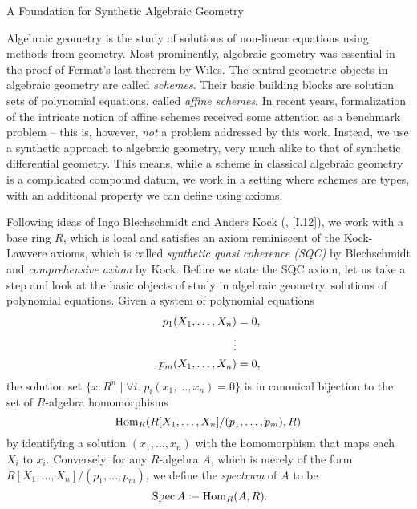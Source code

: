 \documentclass{../util/zariski}
\begin{document}
\begin{center}
  \LARGE{A Foundation for Synthetic Algebraic Geometry}
\end{center}

Algebraic geometry is the study of solutions of non-linear equations using methods from geometry.
Most prominently, algebraic geometry was essential in the proof of Fermat's last theorem by Wiles.
The central geometric objects in algebraic geometry are called \emph{schemes}.
Their basic building blocks are solution sets of polynomial equations, called \emph{affine schemes}.
In recent years,
formalization of the intricate notion of affine schemes
received some attention as a benchmark problem
-- this is, however, \emph{not} a problem addressed by this work.
Instead, we use a synthetic approach to algebraic geometry,
very much alike to that of synthetic differential geometry.
This means, while a scheme in classical algebraic geometry is a complicated compound datum,
we work in a setting where schemes are types,
with an additional property we can define using axioms.

Following ideas of Ingo Blechschmidt and Anders Kock  (\cite{ingo-thesis}, \cite{kock-sdg}[I.12]),
we work with a base ring $R$, which is local and satisfies an axiom reminiscent of the Kock-Lawvere axioms,
which is called \emph{synthetic quasi coherence (SQC)} by Blechschmidt and \emph{comprehensive axiom} by Kock.
Before we state the SQC axiom, let us take a step and look at the basic objects of study in algebraic geometry,
solutions of polynomial equations. 
Given a system of polynomial equations
\begin{align*}
  p_1(X_1, \dots, X_n) &= 0\rlap{,} \\
  \vdots  \\
  p_m(X_1, \dots, X_n) &= 0\rlap{,}
\end{align*}
the solution set
$\{ x : R^n \mid \forall i.\; p_i(x_1, \dots, x_n) = 0 \}$
is in canonical bijection to the set of $R$-algebra homomorphisms
\[ \mathrm{Hom}_R(R[X_1, \dots, X_n]/(p_1, \dots, p_m), R) \]
by identifying a solution $(x_1,\dots,x_n)$ with the homomorphism that maps each $X_i$ to $x_i$.
Conversely, for any $R$-algebra $A$, which is merely of the form $R[X_1, \dots, X_n]/(p_1, \dots, p_m)$,
we define the \emph{spectrum} of $A$ to be
\[
  \Spec A \colonequiv \Hom_R(A, R)
  \rlap{.}
\]


\printbibliography
\end{document}
